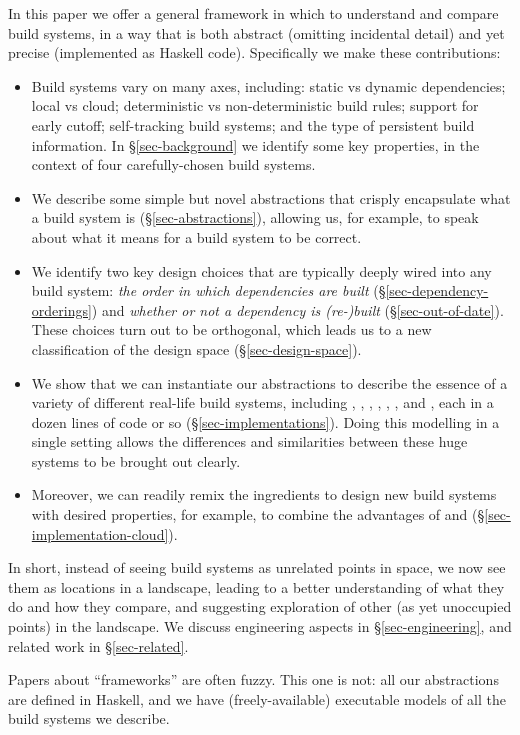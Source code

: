 In this paper we offer a general framework in which to understand
and compare build systems,
in a way that is both abstract (omitting incidental detail)
and yet precise (implemented as Haskell code).  Specifically we make
these contributions:
\begin{itemize}
\item Build systems vary on many axes, including:
static vs dynamic dependencies; local vs cloud; deterministic vs
non-deterministic build rules; support for early cutoff; self-tracking build
systems; and the type of persistent build information.
In \S\ref{sec-background} we identify some key properties, in the context of
four carefully-chosen build systems.
\item We describe some simple but novel abstractions that
  crisply encapsulate what a build system is (\S\ref{sec-abstractions}),
  allowing us, for example, to speak about what it means for a build system to be correct.

\item We identify two key design choices
  that are typically deeply wired into any build system:
  \emph{the order in which dependencies are built} (\S\ref{sec-dependency-orderings})
  and \emph{whether or not a dependency is (re-)built} (\S\ref{sec-out-of-date}).
  These choices turn out to be orthogonal, which leads us to a new
  classification of the design space (\S\ref{sec-design-space}).

\item We show that we can instantiate our abstractions to describe the essence
of a variety of different real-life build systems, including \Make, \Shake,
\Bazel, \CloudBuild, \Buck, \Nix, and \Excel, each in a dozen lines of code
or so (\S\ref{sec-implementations}). Doing this modelling in a single setting
allows the differences and similarities between these huge systems to be
brought out clearly.

\item Moreover, we can readily remix the ingredients to design new build systems
with desired properties, for example, to combine the advantages of \Shake and
\Bazel (\S\ref{sec-implementation-cloud}).

\end{itemize}
In short, instead of seeing build systems as unrelated
points in space, we now see them as locations in a landscape,
leading to a better understanding of what they do and how they compare,
and suggesting exploration of other (as yet unoccupied points) in the
landscape.
We discuss engineering aspects in \S\ref{sec-engineering}, and related
work in \S\ref{sec-related}.

Papers about ``frameworks'' are often fuzzy.  This one is not: all our
abstractions are defined in Haskell, and we have (freely-available)
executable models of all the build systems we describe.

